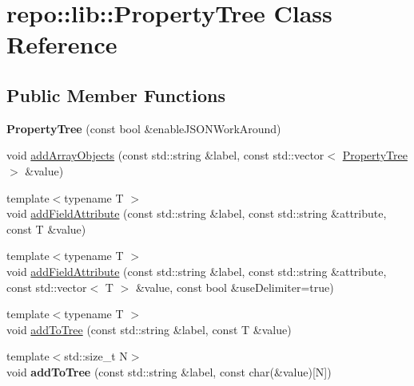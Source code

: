 \hypertarget{classrepo_1_1lib_1_1_property_tree}{}\section{repo\+:\+:lib\+:\+:Property\+Tree Class Reference}
\label{classrepo_1_1lib_1_1_property_tree}
\subsection*{Public Member Functions}
\begin{DoxyCompactItemize}
\item 
\hypertarget{classrepo_1_1lib_1_1_property_tree_a6b9bba9357c593e3f5078782a9cdfb3d}{}{\bfseries Property\+Tree} (const bool \&enable\+J\+S\+O\+N\+Work\+Around)\label{classrepo_1_1lib_1_1_property_tree_a6b9bba9357c593e3f5078782a9cdfb3d}

\item 
void \hyperlink{classrepo_1_1lib_1_1_property_tree_afede341c65d0add71623545e123170ef}{add\+Array\+Objects} (const std\+::string \&label, const std\+::vector$<$ \hyperlink{classrepo_1_1lib_1_1_property_tree}{Property\+Tree} $>$ \&value)
\item 
{\footnotesize template$<$typename T $>$ }\\void \hyperlink{classrepo_1_1lib_1_1_property_tree_a5f27875958fdc8b1e0434a6d73ba2b1a}{add\+Field\+Attribute} (const std\+::string \&label, const std\+::string \&attribute, const T \&value)
\item 
{\footnotesize template$<$typename T $>$ }\\void \hyperlink{classrepo_1_1lib_1_1_property_tree_aa63cfcbb32ddb2d7b73609b929379676}{add\+Field\+Attribute} (const std\+::string \&label, const std\+::string \&attribute, const std\+::vector$<$ T $>$ \&value, const bool \&use\+Delimiter=true)
\item 
{\footnotesize template$<$typename T $>$ }\\void \hyperlink{classrepo_1_1lib_1_1_property_tree_a79fae0e843120797f2eca9a8dc5d9eba}{add\+To\+Tree} (const std\+::string \&label, const T \&value)
\item 
\hypertarget{classrepo_1_1lib_1_1_property_tree_a9c85a9eec0431b10d760f29a1c5c9615}{}{\footnotesize template$<$std\+::size\+\_\+t N$>$ }\\void {\bfseries add\+To\+Tree} (const std\+::string \&label, const char(\&value)\mbox{[}N\mbox{]})\label{classrepo_1_1lib_1_1_property_tree_a9c85a9eec0431b10d760f29a1c5c9615}


\end{DoxyCompactItemize}
